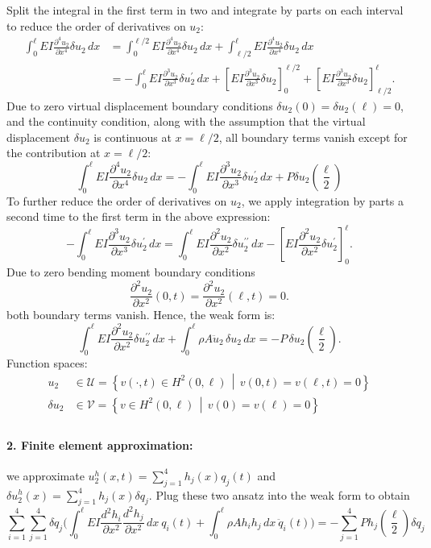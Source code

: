 \documentclass[12pt]{article}
\begin{document}
Split the integral in the first term in two and integrate by parts on each interval to reduce the order of derivatives on \( u_2 \):
\begin{align*}
    \int_0^\ell EI \frac{\partial^4 u_2}{\partial x^4} \delta u_2 \, dx
     & =  \int_0^{\ell/2} EI \frac{\partial ^4 u_2}{\partial x^4} \delta u_2 \, dx + \int_{\ell/2}^\ell EI \frac{\partial^4 u_2}{\partial x^4} \delta u_2 \, dx                                                                                      \\
     & = - \int_0^\ell EI \frac{\partial^3 u_2}{\partial x^3} \delta u_2^\prime  \, dx + \left[ EI \frac{\partial^3 u_2}{\partial x^3} \delta u_2 \right]_0^{\ell/2}+\left[ EI \frac{\partial^3 u_2}{\partial x^3} \delta u_2 \right]_{\ell/2}^\ell.
\end{align*}
Due to zero virtual displacement boundary conditions $ \delta u_2(0) = \delta u_2(\ell) = 0$, and the continuity condition, along with the assumption that the virtual displacement $\delta u_2$ is continuous at $x=\ell/2$, all boundary terms vanish except for the contribution at $x=\ell/2$:
$$\int_0^\ell EI \frac{\partial^4 u_2}{\partial x^4} \delta u_2 \, dx=- \int_0^\ell EI \frac{\partial^3 u_2}{\partial x^3} \delta u_2^\prime \, dx+P\delta u_2\left( \frac{\ell}{2} \right)$$
To further reduce the order of derivatives on $u_2$, we apply integration by parts a second time to the first term in the above expression:
$$- \int_0^\ell EI \frac{\partial^3 u_2}{\partial x^3} \delta u_2^\prime  \, dx   =\int_0^\ell EI \frac{\partial^2 u_2}{\partial x^2} \delta u_2^{\prime\prime}  \, dx - \left[ EI \frac{\partial^2 u_2}{\partial x^2} \delta u_2^\prime \right]_0^\ell.
$$
Due to zero bending moment boundary conditions
\[
    \frac{\partial^2 u_2}{\partial x^2}(0,t) = \frac{\partial^2 u_2}{\partial x^2}(\ell,t) = 0.
\]
both boundary terms vanish. Hence, the weak form is:
\[
    \int_0^\ell EI \frac{\partial^2 u_2}{\partial x^2} \delta u_2^{\prime\prime}  \, dx + \int_0^\ell \rho A \ddot{u}_2 \, \delta u_2 \, dx = -P \, \delta u_2\left( \frac{\ell}{2} \right).
\]
Function spaces:
\begin{align*}
    u_2        & \in \mathcal U = \left\{ v(\cdot,t) \in H^2(0,\ell) \,\middle|\, v(0,t) = v(\ell,t) = 0 \right\} \\
    \delta u_2 & \in \mathcal V = \left\{ v \in H^2(0,\ell) \,\middle|\, v(0) = v(\ell) = 0 \right\}              \\
\end{align*}


\paragraph{2. Finite element approximation:} we approximate $u_2^h(x,t) = \sum_{j=1}^4 h_j(x)q_j(t)$ and $\delta u_2^h(x) = \sum_{j=1}^4 h_j(x)\delta q_j$. Plug these two ansatz into the weak form to obtain
\[
    \sum_{i=1}^4\sum_{j=1}^4\delta q_j \Big( \int_0^\ell EI \frac{d^2 h_i}{\partial x^2} \frac{d^2 h_j}{\partial x^2} \, dx\ q_i(t)
    + \int_0^\ell \rho A h_i h_j \, dx\ \ddot{q}_i(t)
    \Big)= - \sum_{j=1}^4 P h_j\left( \frac{\ell}{2} \right)\delta q_j
\]
\end{document}

